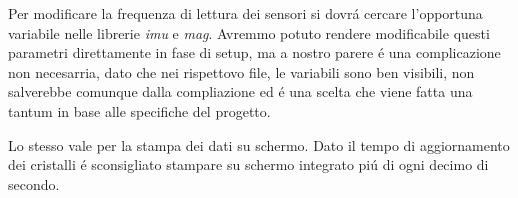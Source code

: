 Per modificare la frequenza di lettura dei sensori si dovrá cercare l’opportuna variabile nelle librerie \emph{imu} e \emph{mag}.
Avremmo potuto rendere modificabile questi parametri direttamente in fase di setup, ma a nostro parere é una complicazione non necesarria, dato che nei rispettovo file, le variabili sono ben visibili, non salverebbe comunque dalla compliazione ed é una scelta che viene fatta una tantum in base alle specifiche del progetto.

Lo stesso vale per la stampa dei dati su schermo.
Dato il tempo di aggiornamento dei cristalli é sconsigliato stampare su schermo integrato piú di ogni decimo di secondo.
